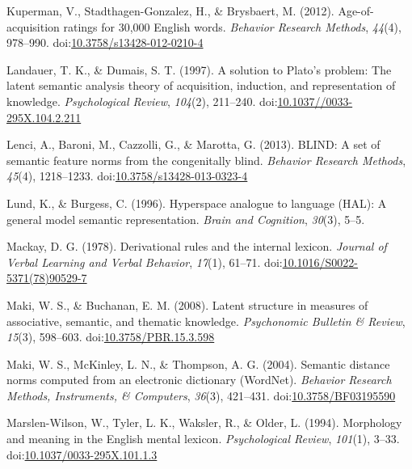 \documentclass[english,,man]{apa6}
\begin{document}
\leavevmode\hypertarget{ref-Kuperman2012}{}%
Kuperman, V., Stadthagen-Gonzalez, H., \& Brysbaert, M. (2012). Age-of-acquisition ratings for 30,000 English words. \emph{Behavior Research Methods}, \emph{44}(4), 978--990. doi:\href{https://doi.org/10.3758/s13428-012-0210-4}{10.3758/s13428-012-0210-4}

\leavevmode\hypertarget{ref-Landauer1997}{}%
Landauer, T. K., \& Dumais, S. T. (1997). A solution to Plato's problem: The latent semantic analysis theory of acquisition, induction, and representation of knowledge. \emph{Psychological Review}, \emph{104}(2), 211--240. doi:\href{https://doi.org/10.1037//0033-295X.104.2.211}{10.1037//0033-295X.104.2.211}

\leavevmode\hypertarget{ref-Lenci2013}{}%
Lenci, A., Baroni, M., Cazzolli, G., \& Marotta, G. (2013). BLIND: A set of semantic feature norms from the congenitally blind. \emph{Behavior Research Methods}, \emph{45}(4), 1218--1233. doi:\href{https://doi.org/10.3758/s13428-013-0323-4}{10.3758/s13428-013-0323-4}

\leavevmode\hypertarget{ref-Lund1996}{}%
Lund, K., \& Burgess, C. (1996). Hyperspace analogue to language (HAL): A general model semantic representation. \emph{Brain and Cognition}, \emph{30}(3), 5--5.

\leavevmode\hypertarget{ref-MacKay1978}{}%
Mackay, D. G. (1978). Derivational rules and the internal lexicon. \emph{Journal of Verbal Learning and Verbal Behavior}, \emph{17}(1), 61--71. doi:\href{https://doi.org/10.1016/S0022-5371(78)90529-7}{10.1016/S0022-5371(78)90529-7}

\leavevmode\hypertarget{ref-Maki2008}{}%
Maki, W. S., \& Buchanan, E. M. (2008). Latent structure in measures of associative, semantic, and thematic knowledge. \emph{Psychonomic Bulletin \& Review}, \emph{15}(3), 598--603. doi:\href{https://doi.org/10.3758/PBR.15.3.598}{10.3758/PBR.15.3.598}

\leavevmode\hypertarget{ref-Maki2004}{}%
Maki, W. S., McKinley, L. N., \& Thompson, A. G. (2004). Semantic distance norms computed from an electronic dictionary (WordNet). \emph{Behavior Research Methods, Instruments, \& Computers}, \emph{36}(3), 421--431. doi:\href{https://doi.org/10.3758/BF03195590}{10.3758/BF03195590}

\leavevmode\hypertarget{ref-Marslen-Wilson1994}{}%
Marslen-Wilson, W., Tyler, L. K., Waksler, R., \& Older, L. (1994). Morphology and meaning in the English mental lexicon. \emph{Psychological Review}, \emph{101}(1), 3--33. doi:\href{https://doi.org/10.1037/0033-295X.101.1.3}{10.1037/0033-295X.101.1.3}
\end{document}
